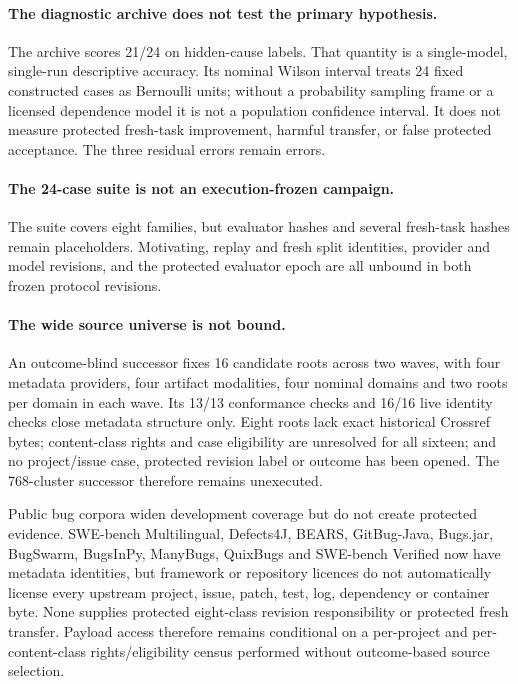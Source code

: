 \paragraph{The diagnostic archive does not test the primary hypothesis.}
The archive scores 21/24 on hidden-cause labels. That quantity is a
single-model, single-run descriptive accuracy. Its nominal Wilson interval
treats 24 fixed constructed cases as Bernoulli units; without a probability
sampling frame or a licensed dependence model it is not a population confidence
interval. It does not measure protected fresh-task improvement, harmful
transfer, or false protected acceptance. The three residual errors remain
errors.

\paragraph{The 24-case suite is not an execution-frozen campaign.}
The suite covers eight families, but evaluator hashes and several fresh-task hashes remain placeholders. Motivating, replay and fresh split identities, provider and model revisions, and the protected evaluator epoch are all unbound in both frozen protocol revisions.

\paragraph{The wide source universe is not bound.}
An outcome-blind successor fixes 16 candidate roots across two waves, with
four metadata providers, four artifact modalities, four nominal domains and
two roots per domain in each wave. Its 13/13 conformance checks and 16/16 live
identity checks close metadata structure only. Eight roots lack exact
historical Crossref bytes; content-class rights and case eligibility are
unresolved for all sixteen; and no project/issue case, protected revision
label or outcome has been opened. The 768-cluster successor therefore remains
unexecuted.

Public bug corpora widen development coverage but do not create protected
evidence. SWE-bench Multilingual, Defects4J, BEARS, GitBug-Java, Bugs.jar,
BugSwarm, BugsInPy, ManyBugs, QuixBugs and SWE-bench Verified now have metadata
identities, but framework or repository licences do not automatically license
every upstream project, issue, patch, test, log, dependency or container byte.
None supplies protected eight-class revision responsibility or protected fresh
transfer. Payload access therefore remains conditional on a per-project and
per-content-class rights/eligibility census performed without outcome-based
source selection.

